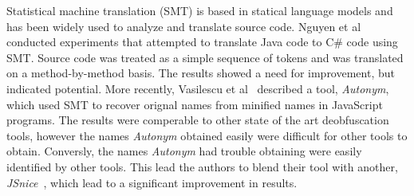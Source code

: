 Statistical machine translation (SMT) is based in statical language models and has been widely used to analyze and translate source code. Nguyen et al~\cite{nguyen2013lexical} conducted experiments that attempted to translate Java code to C\# code using SMT. Source code was treated as a simple sequence of tokens and was translated on a method-by-method basis. The results showed a need for improvement, but indicated potential. More recently, Vasilescu et al~\cite{vasilescu2017recovering} described a tool, \textit{Autonym}, which used SMT to recover orignal names from minified names in JavaScript programs. The results were comperable to other state of the art deobfuscation tools, however the names \textit{Autonym} obtained easily were difficult for other tools to obtain. Conversly, the names \textit{Autonym} had trouble obtaining were easily identified by other tools. This lead the authors to blend their tool with another, \textit{JSnice}~\cite{raychev2015predicting}, which lead to a significant improvement in results.

